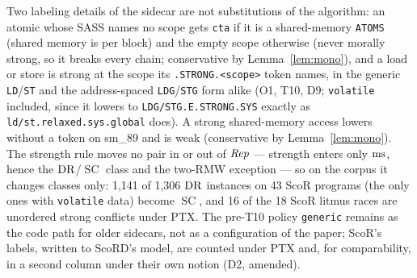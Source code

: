\documentclass[11pt]{article}
\theoremstyle{remark}
\DeclareMathOperator{\SC}{SC}
\begin{document}
\noindent Two labeling details of the sidecar are not substitutions of the algorithm: an
atomic whose SASS names no scope gets \texttt{cta} if it is a shared-memory \texttt{ATOMS}
(shared memory is per block) and the empty scope otherwise (never morally strong, so it
breaks every chain; conservative by Lemma~\ref{lem:mono}), and a load or store is strong at
the scope its \texttt{.STRONG.<scope>} token names, in the generic \texttt{LD}/\texttt{ST} and
the address-spaced \texttt{LDG}/\texttt{STG} form alike (O1, T10, D9; \texttt{volatile}
included, since it lowers to \texttt{LDG/STG.E.STRONG.SYS} exactly as
\texttt{ld/st.relaxed.sys.global} does). A strong shared-memory access lowers without a token
on sm\_89 and is weak (conservative by Lemma~\ref{lem:mono}). The strength rule moves no pair
in or out of $\mathit{Rep}$ --- strength enters only $\operatorname{ms}$, hence the $\operatorname{DR}$/$\SC$ class and the two-RMW
exception --- so on the corpus it changes classes only: 1,141 of 1,306 $\operatorname{DR}$ instances on 43
ScoR programs (the only ones with \texttt{volatile} data) become $\SC$, and 16 of the 18 ScoR
litmus races are unordered strong conflicts under PTX. The pre-T10 policy \texttt{generic}
remains as the code path for older sidecars, not as a configuration of the paper; ScoR's
labels, written to ScoRD's model, are counted under PTX and, for comparability, in a second
column under their own notion (D2, amended).
\end{document}
